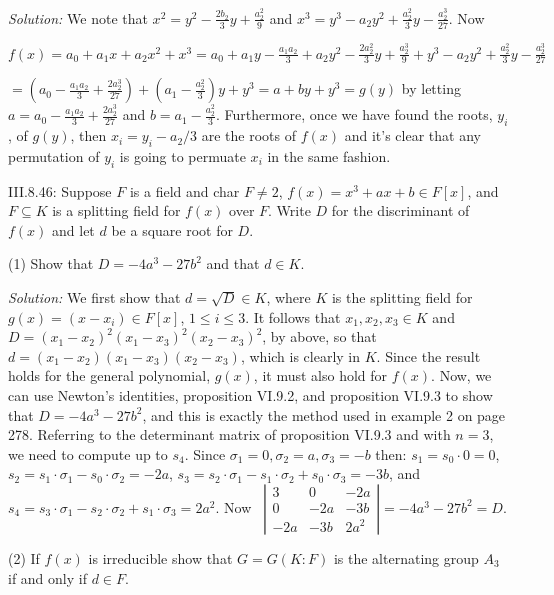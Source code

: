 \documentclass{letter}
\newcommand{\tmem}[1]{{\em #1\/}}
\begin{document}
{\tmem{Solution:}} We note that $x^2 = y^2 - \frac{2 b_2}{3} y +
\frac{a^2_2}{9}$ and $x^3 = y^3 - a_2 y^2 + \frac{a_2^2}{3} y -
\frac{a_2^3}{27}$. Now

$f (x) = a_0 + a_1 x + a_2 x^2 + x^3 = a_0 + a_1 y - \frac{a_1 a_2}{3} + a_2
y^2 - \frac{2 a_2^2}{3} y + \frac{a_2^3}{9} + y^3 - a_2 y^2 + \frac{a_2^2}{3}
y - \frac{a_2^3}{27}$

$= (a_0 - \frac{a_1 a_2}{3} + \frac{2 a_2^3}{27}) + (a_1 - \frac{a_2^2}{3}) y
+ y^3 = a + b y + y^3 = g (y)$ by letting $a = a_0 - \frac{a_1 a_2}{3} +
\frac{2 a_2^3}{27}$ and $b = a_1 - \frac{a_2^2}{3}$. Furthermore, once we have
found the roots, $y_i$, of $g (y)$, then $x_i = y_i - a_2 / 3$ are the roots
of $f (x)$ and it's clear that any permutation of $y_i$ is going to permuate
$x_i$ in the same fashion.

III.8.46: Suppose $F$ is a field and char $F \neq 2$, $f (x) = x^3 + a x + b
\in F [x]$, and $F \subseteq K$ is a splitting field for $f (x)$ over $F$.
Write $D$ for the discriminant of $f (x)$ and let $d$ be a square root for
$D$.

(1) Show that $D = - 4 a^3 - 27 b^2$ and that $d \in K$.

{\tmem{Solution:}} We first show that $d = \sqrt{D} \in K$, where $K$ is the
splitting field for $g (x) = (x - x_i) \in F [x]$, $1 \leq i \leq 3$. It
follows that $x_1, x_2, x_3 \in K$ and $D = (x_1 - x_2)^2 (x_1 - x_3)^2 (x_2 -
x_3)^2$, by above, so that $d = (x_1 - x_2) (x_1 - x_3) (x_2 - x_3)$, which is
clearly in $K$. Since the result holds for the general polynomial, $g (x)$, it
must also hold for $f (x)$. Now, we can use Newton's identities, proposition
VI.9.2, and proposition VI.9.3 to show that $D = - 4 a^3 - 27 b^2$, and this
is exactly the method used in example 2 on page 278. Referring to the
determinant matrix of proposition VI.9.3 and with $n = 3$, we need to compute
up to $s_4$. Since $\sigma_1 = 0, \sigma_2 = a, \sigma_3 = - b$ then: $s_1 =
s_0 \cdot 0 = 0$, $s_2 = s_1 \cdot \sigma_1 - s_0 \cdot \sigma_2 = - 2 a$,
$s_3 = s_2 \cdot \sigma_1 - s_1 \cdot \sigma_2 + s_0 \cdot \sigma_3 = - 3 b$,
and $s_4 = s_3 \cdot \sigma_1 - s_2 \cdot \sigma_2 + s_1 \cdot \sigma_3 = 2
a^2$. Now \ $\left|\begin{array}{ccc}
  3 & 0 & - 2 a\\
  0 & - 2 a & - 3 b\\
  - 2 a & - 3 b & 2 a^2
\end{array}\right| = - 4 a^3 - 27 b^2 = D$.

(2) If $f (x)$ is irreducible show that $G = G (K : F)$ is the alternating
group $A_3$ if and only if $d \in F$.
\end{document}
